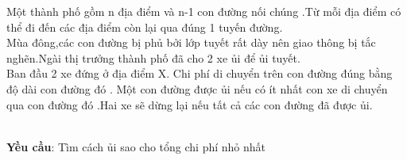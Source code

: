 Một thành phố gồm n địa điểm và n-1 con đường nối chúng .Từ mỗi địa điểm có thể đi đến các địa điểm còn lại qua đúng 1 tuyến đường.
\\Mùa đông,các con đường bị phủ bởi lớp tuyết rất dày nên giao thông bị tắc nghẽn.Ngài thị trưởng thành phố đã cho 2 xe ủi để ủi tuyết.
\\Ban đầu 2 xe đứng ở địa điểm X. Chi phí di chuyển trên con đường đúng bằng độ dài con đường đó . Một con đường được ủi nếu có ít nhất con xe di chuyển qua con đường đó .Hai xe sẽ dừng lại nếu tất cả các con đường đã được ủi.


\\\textbf{Yều cầu}: Tìm cách ủi sao cho tổng chi phí nhỏ nhất
\\ 